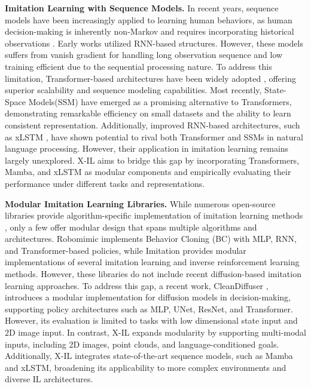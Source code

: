 \textbf{Imitation Learning with Sequence Models.}
In recent years, sequence models have been increasingly applied to learning human behaviors, as human decision-making is inherently non-Markov and requires incorporating historical observations \cite{robomimic2021}. Early works utilized RNN-based structures\cite{robomimic2021}. However, these models suffers from vanish gradient for handling long observation sequence and low training efficient due to the sequential processing nature. To address this limitation, Transformer-based architectures have been widely adopted \cite{shafiullah2022behavior,reuss2023goal,bharadhwaj2024roboagent}, offering superior scalability and sequence modeling capabilities. Most recently, State-Space Models(SSM) \cite{gu2024mambalineartimesequencemodeling,jia2024mailimprovingimitationlearning} have emerged as a promising alternative to Transformers, demonstrating remarkable efficiency on small datasets and the ability to learn consistent representation.  Additionally, improved RNN-based architectures, such as xLSTM \cite{beck2024xlstmextendedlongshortterm}, have shown potential to rival both Transformer and SSMs in natural language processing. However, their application in imitation learning remains largely unexplored. X-IL aims to bridge this gap by incorporating Transformers, Mamba, and xLSTM as modular components and empirically evaluating their performance under different tasks and representations.

\textbf{Modular Imitation Learning Libraries.}
While numerous open-source libraries provide algorithm-specific implementation of imitation learning methods \cite{chi2023diffusion, lee2024behavior, jia2024mailimprovingimitationlearning}, only a few offer modular design that spans multiple algorithms and architectures. Robomimic \cite{robomimic2021} implements Behavior Cloning (BC) with MLP, RNN, and Transformer-based policies,
while Imitation \cite{gleave2022imitation} provides modular implementations of several imitation learning and inverse reinforcement learning methods. However, these libraries do not include recent diffusion-based imitation learning approaches.
To address this gap, a recent work, CleanDiffuser \cite{cleandiffuser}, introduces a modular implementation for diffusion models in decision-making, supporting policy architectures such as MLP, UNet, ResNet, and Transformer. However, its evaluation is limited to tasks with low dimensional state input and 2D image input. In contrast, X-IL expands modularity by supporting multi-modal inputs, including 2D images, point clouds, and language-conditioned goals. Additionally, X-IL integrates state-of-the-art sequence models, such as Mamba and xLSTM, broadening its applicability to more complex environments and diverse IL architectures.